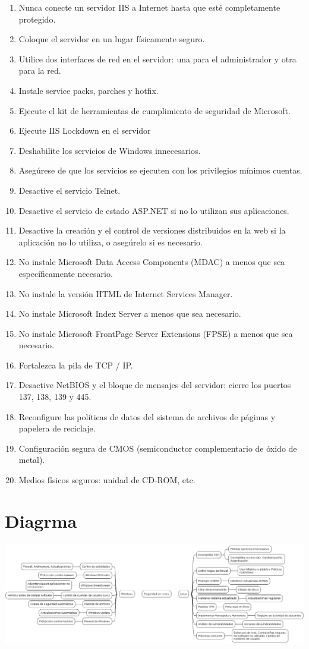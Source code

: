 \documentclass[11pt]{article}
\begin{document}
\begin{enumerate}
\item Nunca conecte un servidor IIS a Internet hasta que esté completamente protegido.
\item Coloque el servidor en un lugar físicamente seguro.
\item Utilice dos interfaces de red en el servidor: una para el administrador y otra para la red.
\item Instale service packs, parches y hotfix.
\item Ejecute el kit de herramientas de cumplimiento de seguridad de Microsoft.
\item Ejecute IIS Lockdown en el servidor
\item Deshabilite los servicios de Windows innecesarios.
\item Asegúrese de que los servicios se ejecuten con los privilegios mínimos cuentas.
\item Desactive el servicio Telnet.
\item Desactive el servicio de estado ASP.NET si no lo utilizan sus aplicaciones.
\item Desactive la creación y el control de versiones distribuidos en la web si la aplicación no lo utiliza, o asegúrelo si es necesario.
\item No instale Microsoft Data Access Components (MDAC) a menos que sea específicamente necesario.
\item No instale la versión HTML de Internet Services Manager.
\item No instale Microsoft Index Server a menos que sea necesario.
\item No instale Microsoft FrontPage Server Extensions (FPSE) a menos que sea necesario.
\item Fortalezca la pila de TCP / IP.
\item Desactive NetBIOS y el bloque de mensajes del servidor: cierre los puertos 137, 138, 139 y 445.
\item Reconfigure las políticas de datos del sistema de archivos de páginas y papelera de reciclaje.
\item Configuración segura de CMOS (semiconductor complementario de óxido de metal).
\item Medios físicos seguros: unidad de CD-ROM, etc.
\end{enumerate}

\section{Diagrma}
\label{sec:org1afe990}
\begin{center}
\includegraphics[width=.9\linewidth]{a.png}
\end{center}
\end{document}
